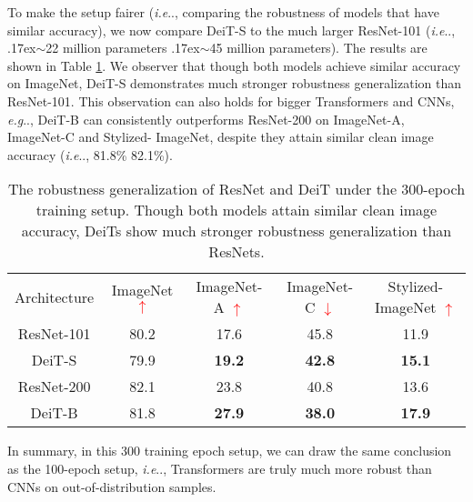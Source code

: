 \documentclass{article}
\makeatletter
\def\vs{{\bm{s}}}
\newcommand{\app}{\raise.17ex\hbox{$\scriptstyle\sim$}}
\DeclareRobustCommand\onedot{\futurelet\@let@token\@onedot}
\def\@onedot{\ifx\@let@token.\else.\null\fi\xspace}
\def\eg{\emph{e.g}\onedot} \def\Eg{\emph{E.g}\onedot}
\def\ie{\emph{i.e}\onedot} \def\Ie{\emph{I.e}\onedot}
\makeatother
\begin{document}
To make the setup fairer (\ie, comparing the robustness of models that have similar accuracy), we now compare DeiT-S to the much larger ResNet-101 (\ie, \app22 million parameters \vs \app45 million parameters). The results are shown in Table \ref{tab:scaleacc}. We observer that though both models achieve similar accuracy on ImageNet, DeiT-S demonstrates much stronger robustness generalization than ResNet-101. This observation can also holds for bigger Transformers and CNNs, \eg, DeiT-B can consistently outperforms ResNet-200 on ImageNet-A, ImageNet-C and Stylized- ImageNet, despite they attain similar clean image accuracy (\ie, 81.8\% \vs 82.1\%). 


\begin{table}[!ht]
\caption{The robustness generalization of ResNet and DeiT under the 300-epoch training setup. Though both models attain similar clean image accuracy, DeiTs show much stronger robustness generalization than ResNets.}
\footnotesize
\centering
\begin{tabular}{c|c|c|c|c}
\shline
 Architecture & ImageNet \textcolor{red}{$\uparrow$} & ImageNet-A \textcolor{red}{$\uparrow$}& ImageNet-C \textcolor{red}{$\downarrow$}& Stylized-ImageNet \textcolor{red}{$\uparrow$}\\ \shline 
ResNet-101	  &  80.2 &	17.6&	45.8&	11.9  \\ 

 DeiT-S &  79.9	& \textbf{19.2} &	\textbf{42.8} &	\textbf{15.1}    \\ \shline 

ResNet-200	  &  82.1 &	23.8 &	40.8 &	13.6 \\ 

 DeiT-B &  81.8 &	\textbf{27.9} &	\textbf{38.0} &	\textbf{17.9}    \\ \hline 
\end{tabular}
\vspace{-1em}
\label{tab:scaleacc}
\end{table}



In summary, in this 300 training epoch setup, we can draw the same conclusion as the 100-epoch setup, \ie, Transformers are truly much more robust than CNNs on out-of-distribution samples.
\end{document}
